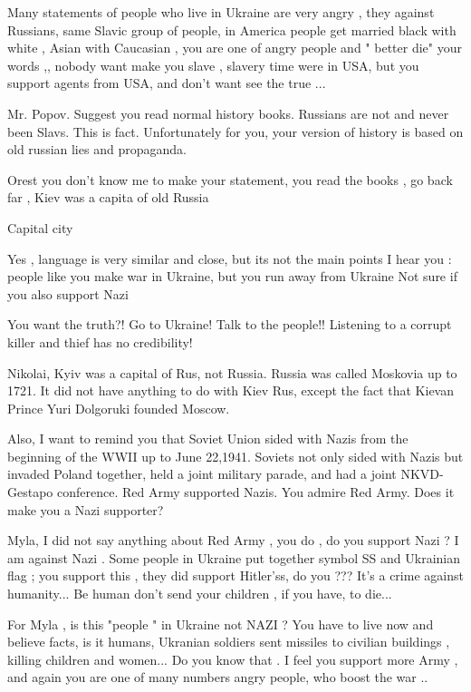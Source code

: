 \begin{itemize}
\begin{itemize}
Many statements of people who live in Ukraine are very angry , they against
Russians, same Slavic group of people, in America people get married black with
white , Asian with Caucasian , you are one of angry people and " better die"
your words ,, nobody want make you slave , slavery time were in USA, but you
support agents from USA, and don't want see the true ...


Mr. Popov. Suggest you read normal history books. Russians are not and never
been Slavs. This is fact. Unfortunately for you, your version of history is
based on old russian lies and propaganda.


Orest you don't know me to make your statement,
you read the books ,
go back far , Kiev was a capita of old Russia

Capital city

Yes , language is very similar and close, but its not the main points
I hear you : people like you make war in Ukraine,
but you run away from Ukraine
Not sure if you also support Nazi


You want the truth?! Go to Ukraine! Talk to the people!!
Listening to a corrupt killer and thief has no credibility!


Nikolai, Kyiv was a capital of Rus, not Russia. Russia was called Moskovia up
to 1721. It did not have anything to do with Kiev Rus, except the fact that
Kievan Prince Yuri Dolgoruki founded Moscow.

Also, I want to remind you that Soviet Union sided with Nazis from the
beginning of the WWII up to June 22,1941. Soviets not only sided with Nazis but
invaded Poland together, held a joint military parade, and had a joint
NKVD-Gestapo conference. Red Army supported Nazis. You admire Red Army. Does it
make you a Nazi supporter?


Myla, I did not say anything about Red Army , you do , do you support Nazi ? I
am against Nazi . Some people in Ukraine put together symbol SS and Ukrainian
flag ; you support this , they did support Hitler'ss, do you ??? It's a crime
against humanity... Be human don't send your children , if you have, to die...



For Myla , is this "people " in Ukraine not NAZI ? You have to live now and
believe facts, is it humans, Ukranian soldiers sent missiles to civilian
buildings , killing children and women... Do you know that . I feel you support
more Army , and again you are one of many numbers angry people, who boost the
war ..


\end{itemize}
\end{itemize}
